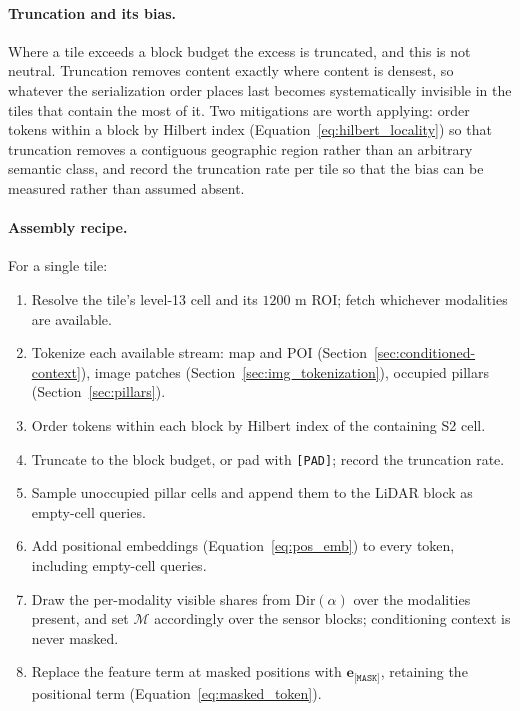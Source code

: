 \documentclass{book}
\begin{document}
\paragraph{Truncation and its bias.}

Where a tile exceeds a block budget the excess is truncated, and
this is not neutral.  Truncation removes content exactly where
content is densest, so whatever the serialization order places
last becomes systematically invisible in the tiles that contain
the most of it.  Two mitigations are worth applying: order
tokens within a block by Hilbert index
(Equation~\eqref{eq:hilbert_locality}) so that truncation removes
a contiguous geographic region rather than an arbitrary
semantic class, and record the truncation rate per tile so that
the bias can be measured rather than assumed absent.

\paragraph{Assembly recipe.}

For a single tile:

\begin{enumerate}
\item Resolve the tile's level-13 cell and its $1200$ m ROI;
  fetch whichever modalities are available.
\item Tokenize each available stream: map and POI
  (Section~\ref{sec:conditioned-context}), image patches
  (Section~\ref{sec:img_tokenization}), occupied pillars
  (Section~\ref{sec:pillars}).
\item Order tokens within each block by Hilbert index of the
  containing S2 cell.
\item Truncate to the block budget, or pad with
  \texttt{[PAD]}; record the truncation rate.
\item Sample unoccupied pillar cells and append them to the
  LiDAR block as empty-cell queries.
\item Add positional embeddings
  (Equation~\eqref{eq:pos_emb}) to every token, including
  empty-cell queries.
\item Draw the per-modality visible shares from
  $\mathrm{Dir}(\alpha)$ over the modalities present, and set
  $\mathcal{M}$ accordingly over the sensor blocks; conditioning
  context is never masked.
\item Replace the feature term at masked positions with
  $\mathbf{e}_{\texttt{[MASK]}}$, retaining the positional term
  (Equation~\eqref{eq:masked_token}).
\end{enumerate}
\end{document}
